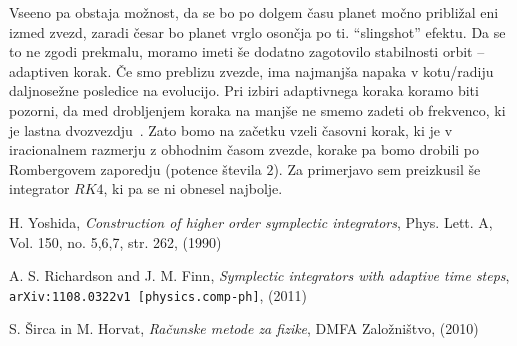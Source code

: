 \documentclass[12pt, a4paper]{article}
\begin{document}
Vseeno pa obstaja mo\v znost, da se bo po dolgem \v casu planet mo\v cno pribli\v zal eni izmed
zvezd, zaradi \v cesar bo planet vrglo oson\v cja po ti. "`slingshot"' efektu. Da se to ne zgodi prekmalu, moramo
imeti \v se dodatno zagotovilo stabilnosti orbit -- adaptiven korak. \v Ce smo preblizu zvezde, ima najmanj\v sa
napaka v kotu/radiju daljnose\v zne posledice na evolucijo. Pri izbiri adaptivnega koraka koramo biti pozorni,
da med drobljenjem koraka na manj\v se ne smemo zadeti ob frekvenco, ki je lastna dvozvezdju~\cite{richardson}.
Zato bomo na za\v cetku vzeli \v casovni korak, ki je v iracionalnem razmerju z obhodnim \v casom zvezde, korake
pa bomo drobili po Rombergovem zaporedju (potence \v stevila $2$). Za primerjavo sem preizkusil \v se
integrator $RK4$, ki pa se ni obnesel najbolje.

\begin{thebibliography}{9}
        H. Yoshida,
        \emph{Construction of higher order symplectic integrators},
        Phys. Lett. A,
        Vol. 150, no. 5,6,7, str. 262,
        (1990)

        A. S. Richardson and J. M. Finn,
        \emph{Symplectic integrators with adaptive time steps},
        {\tt arXiv:1108.0322v1 [physics.comp-ph]},
        (2011)

        S. \v Sirca in M. Horvat,
        {\em Ra\v cunske metode za fizike},
        DMFA Zalo\v zni\v stvo,
        (2010)
\end{thebibliography}
\end{document}
